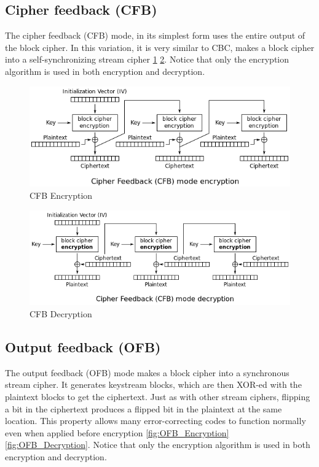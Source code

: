 \subsection{Cipher feedback (CFB)}
\label{sec:CipherFeedback}
The cipher feedback (CFB) mode, in its simplest form uses the entire output of the block cipher. In this variation, it is very similar to CBC, makes a block cipher into a self-synchronizing stream cipher \ref{fig:CFB_Encryption} \ref{fig:CFB_Decryption}.  Notice that only the encryption algorithm is used in both encryption and decryption.
\begin{figure}
	\centering
	\includegraphics[width=0.7\linewidth]{Images/Chapter3/CFB_Encryption}
	\caption{CFB Encryption}
	\label{fig:CFB_Encryption}
\end{figure}

\begin{figure}
	\centering
	\includegraphics[width=0.7\linewidth]{Images/Chapter3/CFB_Decryption}
	\caption{CFB Decryption}
	\label{fig:CFB_Decryption}
\end{figure}

\subsection{Output feedback (OFB)}

The output feedback (OFB) mode makes a block cipher into a synchronous stream cipher. It generates keystream blocks, which are then XOR-ed with the plaintext blocks to get the ciphertext. Just as with other stream ciphers, flipping a bit in the ciphertext produces a flipped bit in the plaintext at the same location. This property allows many error-correcting codes to function normally even when applied before encryption \ref{fig:OFB_Encryption} \ref{fig:OFB_Decryption}.  Notice that only the encryption
algorithm is used in both encryption and decryption.

